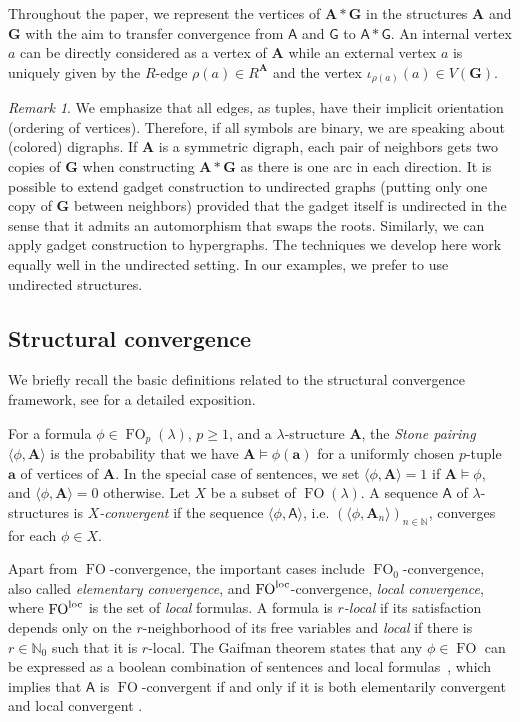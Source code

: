 \documentclass[11pt]{article}
\theoremstyle{plain}
\theoremstyle{definition}
\theoremstyle{remark}
\newtheorem*{remark}{Remark}
\newcommand{\N}{\mathbb{N}}
\DeclareMathOperator\FO{FO}
\newcommand{\FOloc}[1]{\FO_{#1}^\textnormal{loc}}
\newcommand{\stonepar}[2]{\langle #1, #2 \rangle}
\newcommand{\str}[1]{\mathbf{#1}}
\newcommand{\strseq}[1]{{\boldsymbol{\mathsf{#1}}}}
\newcommand{\tpl}[1]{{\bm{#1}}}
\begin{document}
Throughout the paper, we represent the vertices of $\str{A} * \str{G}$ in the structures $\str{A}$ and $\str{G}$ with the aim to transfer convergence from $\strseq{A}$ and $\strseq{G}$ to $\strseq{A} * \strseq{G}$.
An internal vertex $a$ can be directly considered as a vertex of $\str{A}$ while an external vertex $a$ is uniquely given by the $R$-edge $\rho(a) \in R^\str{A}$ and the vertex $\iota_{\rho(a)}(a) \in V(\str{G})$.

\begin{remark}
    We emphasize that all edges, as tuples, have their implicit orientation (ordering of vertices).
    Therefore, if all symbols are binary, we are speaking about (colored) digraphs.
    If $\str{A}$ is a symmetric digraph, each pair of neighbors gets two copies of $\str{G}$ when constructing $\str{A}*\str{G}$ as there is one arc in each direction.
    It is possible to extend gadget construction to undirected graphs (putting only one copy of $\str{G}$ between neighbors) provided that the gadget itself is undirected in the sense that it admits an automorphism that swaps the roots.
    Similarly, we can apply gadget construction to hypergraphs.
    The techniques we develop here work equally well in the undirected setting.
    In our examples, we prefer to use undirected structures.
\end{remark}

\subsection{Structural convergence}\label{ssec:structural_convergence}

We briefly recall the basic definitions related to the structural convergence framework, see \cite{unified_approach} for a detailed exposition.

For a formula $\phi \in \FO_p(\lambda)$, $p \geq 1$, and a $\lambda$-structure $\str{A}$, the \emph{Stone pairing} $\stonepar{\phi}{\str{A}}$ is the probability that we have $\str{A} \models \phi(\tpl{a})$ for a uniformly chosen $p$-tuple $\tpl{a}$ of vertices of $\str{A}$.
In the special case of sentences, we set $\stonepar{\phi}{\str{A}} = 1$ if $\str{A} \models \phi$, and $\stonepar{\phi}{\str{A}} = 0$ otherwise.
Let $X$ be a subset of $\FO(\lambda)$.
A sequence $\strseq{A}$ of $\lambda$-structures is \emph{$X$-convergent} if the sequence $\stonepar{\phi}{\strseq{A}}$, i.e. $(\stonepar{\phi}{\str{A}_n})_{n \in \N}$, converges for each $\phi \in X$.
 
Apart from $\FO$-convergence, the important cases include $\FO_0$-convergence, also called \emph{elementary convergence}, and $\FOloc{}$-convergence, \emph{local convergence}, where $\FOloc{}$ is the set of \emph{local} formulas.
A formula is \emph{$r$-local} if its satisfaction depends only on the $r$-neighborhood of its free variables and \emph{local} if there is $r \in \N_0$ such that it is $r$-local.
The Gaifman theorem states that any $\phi \in \FO$ can be expressed as a boolean combination of sentences and local formulas~\cite{gaifman}, which implies that $\strseq{A}$ is $\FO$-convergent if and only if it is both elementarily convergent and local convergent \cite[Theorem~2.23]{unified_approach}.
\end{document}

